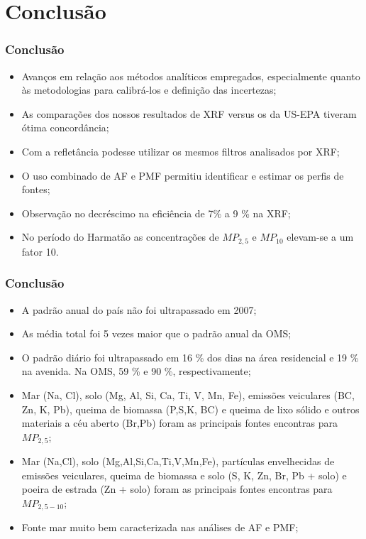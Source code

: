 \section{Conclusão}

\begin{frame}
  \frametitle{Conclusão}
  \begin{itemize}
    \item Avanços em relação aos métodos analíticos empregados, especialmente quanto às metodologias para calibrá-los e definição das incertezas;
    \item As comparações dos nossos resultados de XRF versus os da US-EPA tiveram ótima concordância;
    \item Com a refletância podesse utilizar os mesmos filtros analisados por XRF;
    \item O uso combinado de AF e PMF permitiu identificar e estimar os perfis de fontes;
    \item Observação no decréscimo na eficiência de 7\% a 9 \% na XRF;
        \item No período do Harmatão as concentrações de $MP_{2,5}$ e $MP_{10}$ elevam-se a um fator 10.
  \end{itemize}
\end{frame}

\begin{frame}
  \frametitle{Conclusão}
  \begin{itemize}
    \item A padrão anual do país não foi ultrapassado em 2007;
    \item As média total foi 5 vezes maior que o padrão anual da OMS;
    \item O padrão diário foi ultrapassado em 16 \% dos dias na área residencial e 19 \% na avenida. Na OMS, 59 \% e 90 \%, respectivamente;
    \item Mar (Na, Cl), solo (Mg, Al, Si, Ca, Ti, V, Mn, Fe), emissões veiculares (BC, Zn, K, Pb), queima de biomassa (P,S,K, BC) e queima de lixo sólido e outros materiais a céu aberto (Br,Pb) foram as principais fontes encontras para $MP_{2,5}$;
    \item Mar (Na,Cl), solo (Mg,Al,Si,Ca,Ti,V,Mn,Fe), partículas envelhecidas de emissões veiculares, queima de biomassa e solo (S, K, Zn, Br, Pb + solo) e poeira de estrada (Zn + solo) foram as principais fontes encontras para $MP_{2,5-10}$;
    \item Fonte mar muito bem caracterizada nas análises de AF e PMF;
  \end{itemize}
\end{frame}

